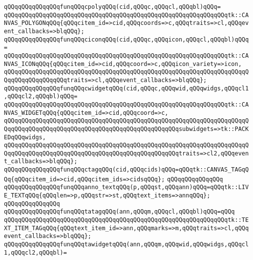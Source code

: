 \verb|qQQqqQQqqQQqqQQqfunqQQqcpolyqQQq(cid,qQQqc,qQQqcl,qQQqbl)qQQq=|\newline
\verb|qQQqqQQqqQQqqQQqqQQqqQQqqQQqqQQqqQQqqQQqqQQqqQQqqQQqqQQqqQQqqQQqtk::CANVAS_POLYGONqQQq{qQQqcitem_id=>cid,qQQqcoords=>c,qQQqtraits=>cl,qQQqevent_callbacks=>blqQQq};|\newline
\verb|qQQqqQQqqQQqqQQqfunqQQqciconqQQq(cid,qQQqc,qQQqicon,qQQqcl,qQQqbl)qQQq=|\newline
\verb|qQQqqQQqqQQqqQQqqQQqqQQqqQQqqQQqqQQqqQQqqQQqqQQqqQQqqQQqqQQqqQQqtk::CANVAS_ICONqQQq{qQQqcitem_id=>cid,qQQqcoord=>c,qQQqicon_variety=>icon,|\newline
\verb|qQQqqQQqqQQqqQQqqQQqqQQqqQQqqQQqqQQqqQQqqQQqqQQqqQQqqQQqqQQqqQQqqQQqqQQqqQQqqQQqqQQqqQQqtraits=>cl,qQQqevent_callbacks=>blqQQq};|\newline
\verb|qQQqqQQqqQQqqQQqfunqQQqcwidgetqQQq(cid,qQQqc,qQQqwid,qQQqwidgs,qQQqcl1,qQQqcl2,qQQqbl)qQQq=|\newline
\verb|qQQqqQQqqQQqqQQqqQQqqQQqqQQqqQQqqQQqqQQqqQQqqQQqqQQqqQQqqQQqqQQqtk::CANVAS_WIDGETqQQq{qQQqcitem_id=>cid,qQQqcoord=>c,|\newline
\verb|qQQqqQQqqQQqqQQqqQQqqQQqqQQqqQQqqQQqqQQqqQQqqQQqqQQqqQQqqQQqqQQqqQQqqQQqqQQqqQQqqQQqqQQqqQQqqQQqqQQqqQQqqQQqqQQqqQQqqQQqsubwidgets=>tk::PACKEDqQQqwidgs,|\newline
\verb|qQQqqQQqqQQqqQQqqQQqqQQqqQQqqQQqqQQqqQQqqQQqqQQqqQQqqQQqqQQqqQQqqQQqqQQqqQQqqQQqqQQqqQQqqQQqqQQqqQQqqQQqqQQqqQQqqQQqqQQqtraits=>cl2,qQQqevent_callbacks=>blqQQq};|\newline
\verb|qQQqqQQqqQQqqQQqfunqQQqctagqQQq(cid,qQQqcids)qQQq=qQQqtk::CANVAS_TAGqQQq{qQQqcitem_id=>cid,qQQqcitem_ids=>cidsqQQq};|\newline
\newline
\verb|qQQqqQQqqQQqqQQq|\newline
\verb|qQQqqQQqqQQqqQQqfunqQQqanno_textqQQq(p,qQQqst,qQQqann)qQQq=qQQqtk::LIVE_TEXTqQQq{qQQqlen=>p,qQQqstr=>st,qQQqtext_items=>annqQQq};|\newline
\newline
\verb|qQQqqQQqqQQqqQQq|\newline
\verb|qQQqqQQqqQQqqQQqfunqQQqtatagqQQq(ann,qQQqm,qQQqcl,qQQqbl)qQQq=qQQq|\newline
\verb|qQQqqQQqqQQqqQQqqQQqqQQqqQQqqQQqqQQqqQQqqQQqqQQqqQQqqQQqqQQqqQQqtk::TEXT_ITEM_TAGqQQq{qQQqtext_item_id=>ann,qQQqmarks=>m,qQQqtraits=>cl,qQQqevent_callbacks=>blqQQq};|\newline
\verb|qQQqqQQqqQQqqQQqfunqQQqtawidgetqQQq(ann,qQQqm,qQQqwid,qQQqwidgs,qQQqcl1,qQQqcl2,qQQqbl)=|\newline
